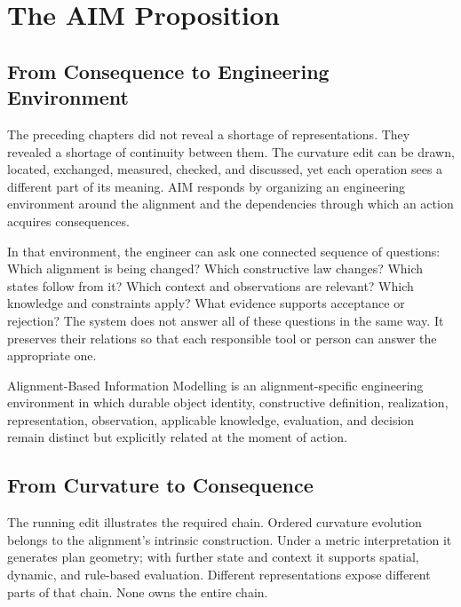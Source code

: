 
\chapter{The AIM Proposition}

\section{From Consequence to Engineering Environment}

The preceding chapters did not reveal a shortage of representations. They
revealed a shortage of continuity between them. The curvature edit can be drawn,
located, exchanged, measured, checked, and discussed, yet each operation sees a
different part of its meaning. AIM responds by organizing an engineering
environment around the alignment and the dependencies through which an action
acquires consequences.

In that environment, the engineer can ask one connected sequence of questions:
Which alignment is being changed? Which constructive law changes? Which states
follow from it? Which context and observations are relevant? Which knowledge and
constraints apply? What evidence supports acceptance or rejection? The system
does not answer all of these questions in the same way. It preserves their
relations so that each responsible tool or person can answer the appropriate
one.

\begin{proposition}
Alignment-Based Information Modelling is an alignment-specific engineering
environment in which durable object identity, constructive definition,
realization, representation, observation, applicable knowledge, evaluation, and
decision remain distinct but explicitly related at the moment of action.
\end{proposition}

\section{From Curvature to Consequence}

The running edit illustrates the required chain. Ordered curvature evolution
belongs to the alignment's intrinsic construction. Under a metric
interpretation it generates plan geometry; with further state and context it
supports spatial, dynamic, and rule-based evaluation. Different
representations expose different parts of that chain. None owns the entire
chain.

